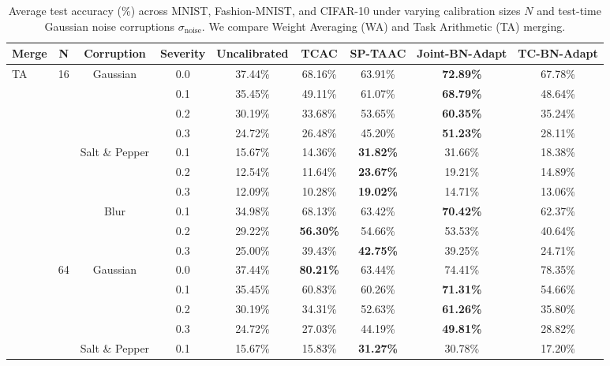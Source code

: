 \documentclass{article}
\begin{document}
\begin{table}[t]
\caption{Average test accuracy (\%) across MNIST, Fashion-MNIST, and CIFAR-10 under varying calibration sizes $N$ and test-time Gaussian noise corruptions $\sigma_{\text{noise}}$. We compare Weight Averaging (WA) and Task Arithmetic (TA) merging.}
\label{tab:results}
\begin{center}
\begin{small}
\begin{tabular}{lcccccccc}
\toprule
\textbf{Merge} & \textbf{N} & \textbf{Corruption} & \textbf{Severity} & \textbf{Uncalibrated} & \textbf{TCAC} & \textbf{SP-TAAC} & \textbf{Joint-BN-Adapt} & \textbf{TC-BN-Adapt} \\
\midrule
TA & 16 & Gaussian & 0.0 & 37.44\% & 68.16\% & 63.91\% & \textbf{72.89\%} & 67.78\% \\
 &  &  & 0.1 & 35.45\% & 49.11\% & 61.07\% & \textbf{68.79\%} & 48.64\% \\
 &  &  & 0.2 & 30.19\% & 33.68\% & 53.65\% & \textbf{60.35\%} & 35.24\% \\
 &  &  & 0.3 & 24.72\% & 26.48\% & 45.20\% & \textbf{51.23\%} & 28.11\% \\
 &  & Salt \& Pepper & 0.1 & 15.67\% & 14.36\% & \textbf{31.82\%} & 31.66\% & 18.38\% \\
 &  &  & 0.2 & 12.54\% & 11.64\% & \textbf{23.67\%} & 19.21\% & 14.89\% \\
 &  &  & 0.3 & 12.09\% & 10.28\% & \textbf{19.02\%} & 14.71\% & 13.06\% \\
 &  & Blur & 0.1 & 34.98\% & 68.13\% & 63.42\% & \textbf{70.42\%} & 62.37\% \\
 &  &  & 0.2 & 29.22\% & \textbf{56.30\%} & 54.66\% & 53.53\% & 40.64\% \\
 &  &  & 0.3 & 25.00\% & 39.43\% & \textbf{42.75\%} & 39.25\% & 24.71\% \\
\midrule
 & 64 & Gaussian & 0.0 & 37.44\% & \textbf{80.21\%} & 63.44\% & 74.41\% & 78.35\% \\
 &  &  & 0.1 & 35.45\% & 60.83\% & 60.26\% & \textbf{71.31\%} & 54.66\% \\
 &  &  & 0.2 & 30.19\% & 34.31\% & 52.63\% & \textbf{61.26\%} & 35.80\% \\
 &  &  & 0.3 & 24.72\% & 27.03\% & 44.19\% & \textbf{49.81\%} & 28.82\% \\
 &  & Salt \& Pepper & 0.1 & 15.67\% & 15.83\% & \textbf{31.27\%} & 30.78\% & 17.20\% \\

\end{tabular}
\end{small}
\end{center}
\end{table}
\end{document}
